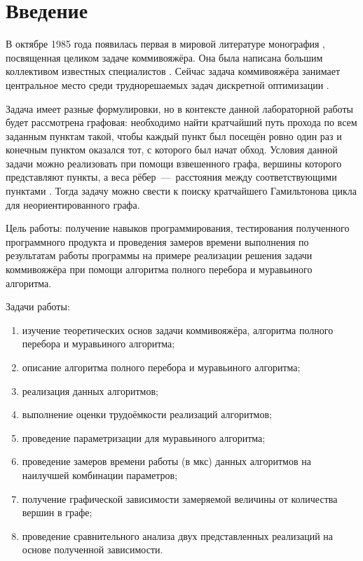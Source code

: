 \setcounter{page}{3}
\chapter*{Введение}
В октябре 1985 года появилась первая в мировой литературе монография \cite{item9}, посвященная целиком задаче коммивояжёра. Она была написана большим коллективом известных специалистов \cite{item10}. 
Сейчас задача коммивояжёра занимает центральное место среди труднорешаемых задач дискретной оптимизации \cite{item10}. 

Задача имеет разные формулировки, но в контексте данной лабораторной работы будет рассмотрена графовая: необходимо найти кратчайший путь прохода по всем заданным пунктам такой, чтобы каждый пункт был посещён ровно один раз и конечным пунктом оказался тот, с которого был начат обход. Условия данной задачи можно реализовать при помощи взвешенного графа, вершины которого представляют пункты, а веса рёбер~---~расстояния между соответствующими пунктами \cite{item11}. Тогда задачу можно свести к поиску кратчайшего Гамильтонова цикла \cite{item12} для неориентированного графа.

Цель работы: получение навыков программирования, тестирования полученного программного продукта и проведения замеров времени выполнения по результатам работы программы на примере реализации решения задачи коммивояжёра при помощи алгоритма полного перебора и муравьиного алгоритма.

Задачи работы:
\begin{enumerate}[label={\arabic*)}]
	\item изучение теоретических основ задачи коммивояжёра, алгоритма полного перебора и муравьиного алгоритма;
	\item описание алгоритма полного перебора и муравьиного алгоритма;
	\item реализация данных алгоритмов;
	\item выполнение оценки трудоёмкости реализаций алгоритмов;
	\item проведение параметризации для муравьиного алгоритма;
	\item проведение замеров времени работы (в мкс) данных алгоритмов на наилучшей комбинации параметров; 
	\item получение графической зависимости замеряемой величины от количества вершин в графе;
	\item проведение сравнительного анализа двух представленных реализаций  на основе полученной зависимости.
\end{enumerate}

\newpage
